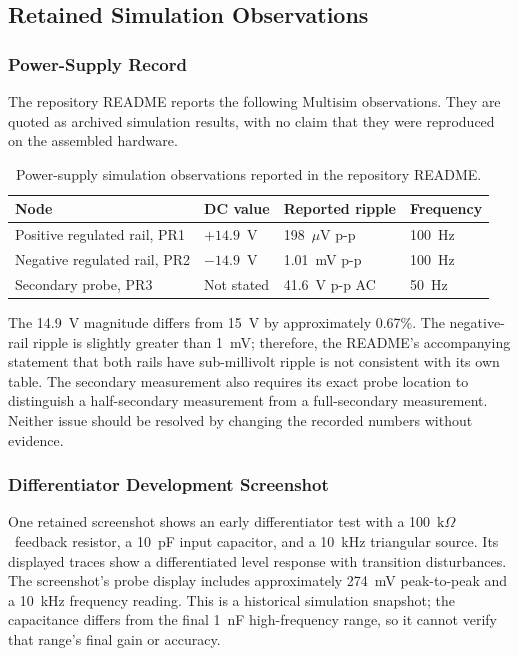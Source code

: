 \documentclass[11pt,a4paper]{article}
\newcommand{\kohm}{\ensuremath{\mathrm{k}\Omega}}
\begin{document}
\subsection{Retained Simulation Observations}
\subsubsection{Power-Supply Record}
The repository README reports the following Multisim observations. They are quoted as archived simulation results, with no claim that they were reproduced on the assembled hardware.

\begin{table}[htbp]
\centering
\caption{Power-supply simulation observations reported in the repository README.}
\begin{tabular}{llll}
\toprule
\textbf{Node} & \textbf{DC value} & \textbf{Reported ripple} & \textbf{Frequency}\\
\midrule
Positive regulated rail, PR1 & $+14.9$~V & 198~$\mu$V p-p & 100~Hz\\
Negative regulated rail, PR2 & $-14.9$~V & 1.01~mV p-p & 100~Hz\\
Secondary probe, PR3 & Not stated & 41.6~V p-p AC & 50~Hz\\
\bottomrule
\end{tabular}
\end{table}

The 14.9~V magnitude differs from 15~V by approximately 0.67\%. The negative-rail ripple is slightly greater than 1~mV; therefore, the README's accompanying statement that both rails have sub-millivolt ripple is not consistent with its own table. The secondary measurement also requires its exact probe location to distinguish a half-secondary measurement from a full-secondary measurement. Neither issue should be resolved by changing the recorded numbers without evidence.

\subsubsection{Differentiator Development Screenshot}
One retained screenshot shows an early differentiator test with a 100~\kohm\ feedback resistor, a 10~pF input capacitor, and a 10~kHz triangular source. Its displayed traces show a differentiated level response with transition disturbances. The screenshot's probe display includes approximately 274~mV peak-to-peak and a 10~kHz frequency reading. This is a historical simulation snapshot; the capacitance differs from the final 1~nF high-frequency range, so it cannot verify that range's final gain or accuracy.
\end{document}
